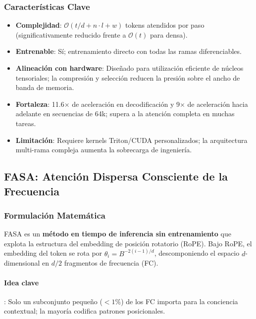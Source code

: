 \documentclass[11pt,a4paper]{article}
\begin{document}
\subsubsection{Características Clave}

\begin{itemize}[leftmargin=*]
    \item \textbf{Complejidad}: $\mathcal{O}(t/d + n \cdot l + w)$ tokens atendidos por paso (significativamente reducido frente a $\mathcal{O}(t)$ para densa).
    \item \textbf{Entrenable}: Sí; entrenamiento directo con todas las ramas diferenciables.
    \item \textbf{Alineación con hardware}: Diseñado para utilización eficiente de núcleos tensoriales; la compresión y selección reducen la presión sobre el ancho de banda de memoria.
    \item \textbf{Fortaleza}: 11.6$\times$ de aceleración en decodificación y 9$\times$ de aceleración hacia adelante en secuencias de 64k; supera a la atención completa en muchas tareas.
    \item \textbf{Limitación}: Requiere kernels Triton/CUDA personalizados; la arquitectura multi-rama compleja aumenta la sobrecarga de ingeniería.
\end{itemize}

\subsection{FASA: Atención Dispersa Consciente de la Frecuencia}

\subsubsection{Formulación Matemática}

FASA \citep{wang_fasa_2026} es un \textbf{método en tiempo de inferencia sin entrenamiento} que explota la estructura del embedding de posición rotatorio (RoPE). Bajo RoPE, el embedding del token se rota por $\theta_i = B^{-2(i-1)/d}$, descomponiendo el espacio $d$-dimensional en $d/2$ fragmentos de frecuencia (FC).

\paragraph{Idea clave}: Solo un subconjunto pequeño ($ < 1\%$) de los FC importa para la conciencia contextual; la mayoría codifica patrones posicionales.
\end{document}
